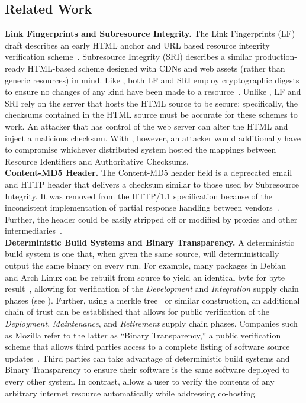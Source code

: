 \subsection{Related Work}

\noindent\textbf{Link Fingerprints and Subresource Integrity.} The Link
Fingerprints (LF) draft describes an early HTML anchor and URL based resource
integrity verification scheme~\cite{LF}. Subresource Integrity (SRI) describes a
similar production-ready HTML-based scheme designed with CDNs and web assets
(rather than generic resources) in mind. Like \SYSTEM{}, both LF and SRI employ
cryptographic digests to ensure no changes of any kind have been made to a
resource~\cite{SRI}. Unlike \SYSTEM{}, LF and SRI rely on the server that hosts
the HTML source to be secure; specifically, the checksums contained in the HTML
source must be accurate for these schemes to work. An attacker that has control
of the web server can alter the HTML and inject a malicious checksum. With
\SYSTEM{}, however, an attacker would additionally have to compromise whichever
distributed system hosted the mappings between Resource Identifiers and
Authoritative Checksums. \\

\noindent\textbf{Content-MD5 Header.} The Content-MD5 header field is a
deprecated email and HTTP header that delivers a checksum similar to those used
by Subresource Integrity. It was removed from the HTTP/1.1 specification because
of the inconsistent implementation of partial response handling between
vendors~\cite{HTTP1.1}. Further, the header could be easily stripped off or
modified by proxies and other intermediaries~\cite{MD5Header}. \\

\noindent\textbf{Deterministic Build Systems and Binary Transparency.} A
deterministic build system is one that, when given the same source, will
deterministically output the same binary on every run. For example, many
packages in Debian~\cite{ReproBuildsDebian} and Arch Linux can be rebuilt from
source to yield an identical byte for byte result~\cite{ReproBuilds}, allowing
for verification of the \emph{Development} and \emph{Integration} supply chain
phases (see ). Further, using a merkle tree~\cite{MerkleTree} or
similar construction, an additional chain of trust can be established that
allows for public verification of the \emph{Deployment}, \emph{Maintenance}, and
\emph{Retirement} supply chain phases. Companies such as Mozilla refer to the
latter as ``Binary Transparency,'' a public verification scheme that allows
third parties access to a complete listing of software source
updates~\cite{BinaryTransparency}. Third parties can take advantage of
deterministic build systems and Binary Transparency to ensure their software is
the same software deployed to every other system. In contrast, \SYSTEM{} allows
a user to verify the contents of any arbitrary internet resource automatically
while addressing co-hosting. \\

